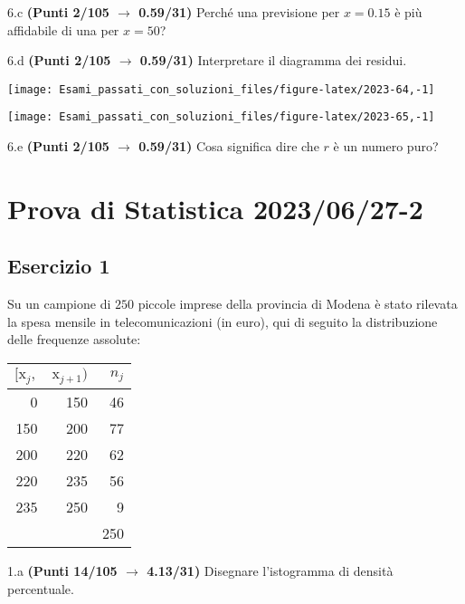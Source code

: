 \documentclass[
  11pt,
]{book}
\theoremstyle{mytheoremstyle}
\theoremstyle{mydefstyle}
\newenvironment{sol}
  {
  \begin{tcolorbox}[enhanced,breakable,arc=0.1mm,boxrule=1pt,colback=white,colframe=iblue,
  title=\bf \fontfamily{lmss}\selectfont \hspace{.5 cm} Soluzione,drop fuzzy shadow]

}{
\end{tcolorbox}
  }
\begin{document}
6.c \textbf{(Punti 2/105 \(\rightarrow\) 0.59/31)} Perché una previsione per \(x=0.15\) è più affidabile di una per \(x=50\)?

6.d \textbf{(Punti 2/105 \(\rightarrow\) 0.59/31)} Interpretare il diagramma dei residui.

\begin{center}\texttt{[image: Esami\_passati\_con\_soluzioni\_files/figure-latex/2023-64,-1]} \end{center}

\begin{sol}

\begin{center}\texttt{[image: Esami\_passati\_con\_soluzioni\_files/figure-latex/2023-65,-1]} \end{center}

\end{sol}

6.e \textbf{(Punti 2/105 \(\rightarrow\) 0.59/31)} Cosa significa dire che \(r\) è un numero puro?

\section{Prova di Statistica 2023/06/27-2}\label{prova-di-statistica-20230627-2}

\subsection{Esercizio 1}\label{esercizio-1-30}

Su un campione di \(250\) piccole imprese della provincia di Modena è stato rilevata la spesa mensile in telecomunicazioni (in euro), qui di seguito
la distribuzione delle frequenze assolute:

\begin{table}[H]
\centering
\begin{tabular}{rrr}
\toprule
$[\text{x}_j,$ & $\text{x}_{j+1})$ & $n_j$\\
\midrule
0 & 150 & 46\\
150 & 200 & 77\\
200 & 220 & 62\\
220 & 235 & 56\\
235 & 250 & 9\\
 &  & 250\\
\bottomrule
\end{tabular}
\end{table}

1.a \textbf{(Punti 14/105 \(\rightarrow\) 4.13/31)} Disegnare l'istogramma di densità percentuale.
\end{document}
